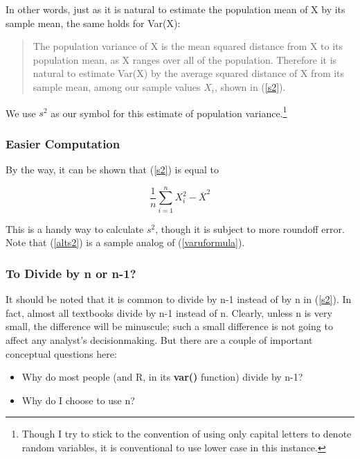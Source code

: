 In other words, just as it is natural to estimate the population mean of
X by its sample mean, the same holds for Var(X):

\begin{quote}
The population variance of X is the mean squared distance from X to its
population mean, as X ranges over all of the population.  Therefore 
it is natural to estimate Var(X) by the average squared distance of X 
from its sample mean, among our sample values $X_i$, shown in 
(\ref{s2}).
\end{quote}


We use $s^2$ as our symbol for this estimate of population
variance.\footnote{Though I try to stick to the convention of using only
capital letters to denote random variables, it is conventional to use
lower case in this instance.} 

\subsubsection{Easier Computation}

By the way, it can be shown that (\ref{s2}) is equal to 

\begin{equation}
\label{alts2}
\frac{1}{n} \sum_{i=1}^{n} X_i^2 - \overline{X}^2
\end{equation}

This is a handy way to calculate $s^2$, though it is subject to more
roundoff error.  Note that (\ref{alts2}) is a sample analog of
(\ref{varuformula}).

\subsubsection{To Divide by n or n-1?}
\label{dividebywhat}

It should be noted that it is common to divide by n-1 instead of by n in
(\ref{s2}).  In fact, almost all textbooks divide by n-1 instead of n.
Clearly, unless n is very small, the difference will be minuscule; such
a small difference is not going to affect any analyst's decisionmaking.
But there are a couple of important conceptual questions here:

\begin{itemize}

\item Why do most people (and R, in its {\bf var()} function) divide by
n-1?

\item Why do I choose to use n?

\end{itemize}

